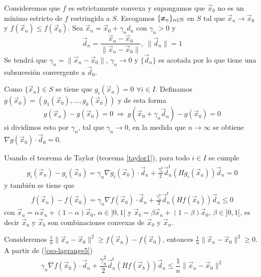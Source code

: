 \begin{demostracion}
Consideremos que $f$ es estrictamente convexa y supongamos que $\vec{x}_0$ no es un m\'inimo estricto de $f$ restringida a $S$. Escogamos $\{\boldsymbol{x}_n\}_{n\in \mathbb{N}}$ en $S$ tal que $\vec{x}_n \to \vec{x}_0$ y $f(\vec{x}_n)\leq f(\vec{x}_0)$. Sea $\vec{x}_n = \vec{x}_0 + \gamma_n d_n$ con $\gamma_n > 0$ y
$$\vec{d}_n=\frac{\vec{x}_n - \vec{x}_0}{\|\vec{x}_n - \vec{x}_0\|} ,\: \|\vec{d}_n\|=1$$
Se tendr\'a que $\gamma_n = \|\vec{x}_n - \vec{x}_0\|$, $\gamma_n \to 0$ y $\{\vec{d}_n\}$ es acotada por lo que tiene una subsucesi\'on convergente a $\vec{d}_0$. 

Como $\{\vec{x}_n\}\in S$ se tiene que $g_i(\vec{x}_n)=0$ $\forall i\in I$. Definamos $g(\vec{x}_0)=(g_1(\vec{x}_0),\ldots,g_k(\vec{x}_0))$ y de esta forma 
$$g(\vec{x}_n)-g(\vec{x}_0)= 0 \:\Rightarrow\: g(\vec{x}_0 + \gamma_n \vec{d}_n) -g(\vec{x}_0)= 0$$
si dividimos esto por $\gamma_n$, tal que $\gamma_n \to 0$, en la medida que $n\to \infty$ se obtiene $\nabla g(\vec{x}_0)\cdot \vec{d}_0 = 0$.

Usando el teorema de Taylor (teorema \ref{taylor1}), para todo $i\in I$ se cumple
\begin{gather}\label{cso-lagrange4}
g_i(\vec{x}_n)-g_i(\vec{x}_0)=\gamma_n \nabla g_i(\vec{x}_0)\cdot \vec{d}_n + \frac{\gamma_n^2}{2} \vec{d}_n^t (H g_i (\vec{x}_a)) \vec{d}_n = 0 \tag{*}
\end{gather}
y tambi\'en se tiene que
\begin{gather}\label{cso-lagrange5}
f(\vec{x}_n)-f(\vec{x}_0)=\gamma_n \nabla f(\vec{x}_0)\cdot \vec{d}_n + \frac{\gamma_n^2}{2} \vec{d}_n^t (H f(\vec{x}_b)) \vec{d}_n \leq 0 \tag{**}
\end{gather}
con $\vec{x}_a = \alpha \vec{x}_n + (1-\alpha)\vec{x}_0$, $\alpha \in ]0,1[$ y $\vec{x}_b = \beta \vec{x}_n + (1-\beta)\vec{x}_0$, $\beta \in ]0,1[$, es decir $\vec{x}_a$ y $\vec{x}_b$ son combinaciones convexas de $\vec{x}_0$ y $\vec{x}_n$.

Consideremos $\frac{1}{n}\|\vec{x}_n-\vec{x}_0\|^2 \geq f(\vec{x}_n) - f(\vec{x}_0)$, entonces $\frac{1}{n}\|\vec{x}_n-\vec{x}_0\|^2 \geq 0$. A partir de (\ref{cso-lagrange5})
$$
\gamma_n \nabla f(\vec{x}_0)\cdot \vec{d}_n + \frac{\gamma_n^2}{2} \vec{d}_n^t (H f(\vec{x}_b)) \vec{d}_n \leq \frac{1}{n}\|\vec{x}_n-\vec{x}_0\|^2
$$


\end{demostracion}
